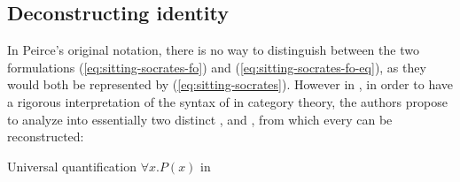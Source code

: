 \begin{scope}
\begin{scope}
\subsection{Deconstructing identity}

In Peirce's original notation, there is no way to distinguish between the two
formulations (\ref{eq:sitting-socrates-fo}) and
(\ref{eq:sitting-socrates-fo-eq}), as they would both be represented by
 (\ref{eq:sitting-socrates}). However in
, in order to have a rigorous
interpretation of the syntax of  in category theory, the authors
propose to analyze  into essentially two distinct ,
\emph{} and \emph{}, from which every  can be reconstructed:

\begin{marginfigure}
  
  \caption{Universal quantification $\forall x. P(x)$ in }
\end{marginfigure}


\end{scope}
\end{scope}
